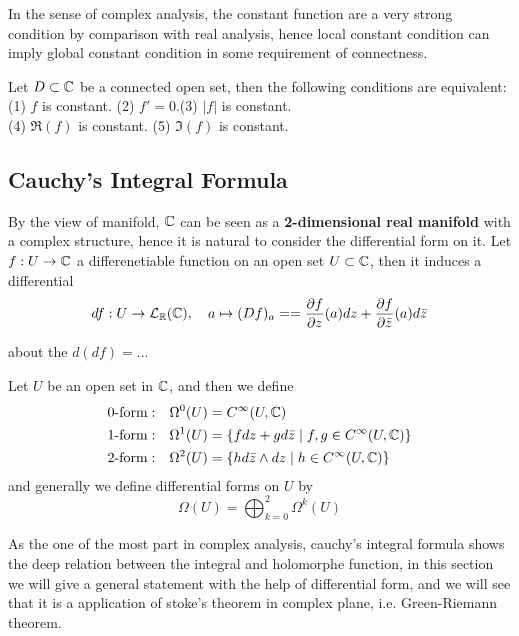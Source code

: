 \documentclass[12pt,a4paper]{article}
\begin{document}
In the sense of complex analysis, the constant function are a very strong condition by comparison with real analysis, hence local constant condition can imply global constant condition in some requirement of connectness.
\begin{corollaryplain}
    Let \(D \subset \mathbb{C}\) be a connected open set, then the following conditions are equivalent:\\
    (1) \(f\) is constant. \qquad (2) \(f' = 0\).\qquad  (3) \(|f|\) is constant.\\
    (4) \(\Re(f)\) is constant. \qquad (5) \(\Im(f)\) is constant. 
\end{corollaryplain}

\subsection{Cauchy's Integral Formula}

By the view of manifold, \(\mathbb{C}\) can be seen as a \textbf{2-dimensional real manifold} with a complex structure, hence it is natural to consider the differential form on it. Let \(f: U \to \mathbb{C}\) a differenetiable function on an open set \(U \subset \mathbb{C}\), then it induces a differential
\[df: U \to \mathcal{L}_{\mathbb{R}}(\mathbb{C}), \quad a \mapsto (Df)_a = = \frac{\partial f}{\partial z}(a) dz + \frac{\partial f}{\partial \bar{z}}(a) d\bar{z}\]

about the \(d(df) = ...\)

\begin{definitionplain}
    Let \(U\) be an open set in \(\mathbb{C}\), and then we define 
    \begin{align*}
        \text{0-form}: & \quad \Omega^0(U) = C^{\infty}(U,\mathbb{C}) \\
        \text{1-form}: & \quad \Omega^1(U) = \{f dz + g d\bar{z} \mid f,g \in C^{\infty}(U,\mathbb{C})\}\\
        \text{2-form}: & \quad \Omega^2(U) = \{h d\bar{z} \wedge dz \mid h \in C^{\infty}(U,\mathbb{C})\}
    \end{align*}
    and generally we define differential forms on \(U\) by
    \[\Omega(U) = \bigoplus_{k=0}^2 \Omega^k(U)\]
\end{definitionplain}




As the one of the most part in complex analysis, cauchy's integral formula shows the deep relation between the integral and holomorphe function, in this section we will give a general statement with the help of differential form, and we will see that it is a application of stoke's theorem in complex plane, i.e. Green-Riemann theorem.
\end{document}
